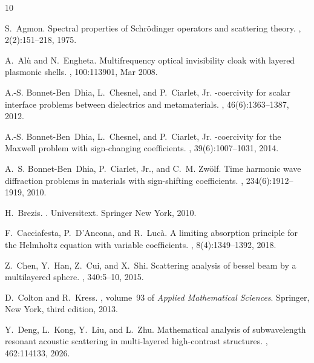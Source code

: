 \documentclass[12pt,reqno]{amsart}
\numberwithin{equation}{section}
\begin{document}
\begin{thebibliography}{10}

S.~Agmon.
\newblock Spectral properties of {S}chr\"odinger operators and scattering
  theory.
, 2(2):151--218, 1975.

A.~Al\`u and N.~Engheta.
\newblock Multifrequency optical invisibility cloak with layered plasmonic
  shells.
, 100:113901, Mar 2008.

A.-S. Bonnet-Ben~Dhia, L.~Chesnel, and P.~Ciarlet, Jr.
-coercivity for scalar interface problems between dielectrics
  and metamaterials.
, 46(6):1363--1387, 2012.

A.-S. Bonnet-Ben~Dhia, L.~Chesnel, and P.~Ciarlet, Jr.
-coercivity for the {M}axwell problem with sign-changing
  coefficients.
, 39(6):1007--1031, 2014.

A.~S. Bonnet-Ben~Dhia, P.~Ciarlet, Jr., and C.~M. Zw\"olf.
\newblock Time harmonic wave diffraction problems in materials with
  sign-shifting coefficients.
, 234(6):1912--1919, 2010.

H.~Brezis.
.
\newblock Universitext. Springer New York, 2010.

F.~Cacciafesta, P.~D'Ancona, and R.~Luc\`a.
\newblock A limiting absorption principle for the {H}elmholtz equation with
  variable coefficients.
, 8(4):1349--1392, 2018.

Z.~Chen, Y.~Han, Z.~Cui, and X.~Shi.
\newblock Scattering analysis of bessel beam by a multilayered sphere.
, 340:5--10, 2015.

D.~Colton and R.~Kress.
,
  volume~93 of {\em Applied Mathematical Sciences}.
\newblock Springer, New York, third edition, 2013.

Y.~Deng, L.~Kong, Y.~Liu, and L.~Zhu.
\newblock Mathematical analysis of subwavelength resonant acoustic scattering
  in multi-layered high-contrast structures.
, 462:114133, 2026.


\end{thebibliography}
\end{document}

